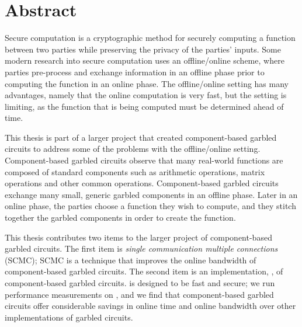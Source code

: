 
\chapter*{Abstract}

Secure computation is a cryptographic method for securely computing a function between two parties while preserving the privacy of the parties' inputs.
Some modern research into secure computation uses an offline/online scheme, where parties pre-process and exchange information in an offline phase prior to computing the function in an online phase. 
The offline/online setting has many advantages, namely that the online computation is very fast, but the setting is limiting, as the function that is being computed must be determined ahead of time.

This thesis is part of a larger project that created component-based garbled circuits to address some of the problems with the offline/online setting.
Component-based garbled circuits observe that many real-world functions are composed of standard components such as arithmetic operations, matrix operations and other common operations.
Component-based garbled circuits exchange many small, generic garbled components in an offline phase. 
Later in an online phase, the parties choose a function they wish to compute, and they stitch together the garbled components in order to create the function.

This thesis contributes two items to the larger project of component-based garbled circuits.
The first item is \textit{single communication multiple connections} (SCMC); SCMC is a technique that improves the online bandwidth of component-based garbled circuits.
The second item is an implementation, \CompGC, of component-based garbled circuits.
\CompGC is designed to be fast and secure; we run performance measurements on \CompGC, and we find that component-based garbled circuits offer considerable savings in online time and online bandwidth over other implementations of garbled circuits. 

